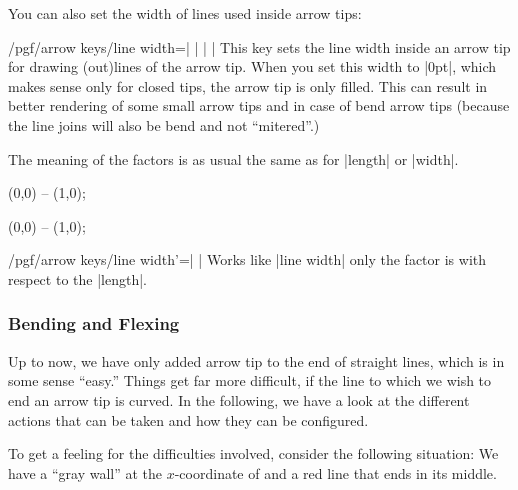 You can also set the width of lines used inside arrow tips:

\begin{key}{/pgf/arrow keys/line width=| |%
    | |}
  This key sets the line width inside an arrow tip for drawing
  (out)lines of the arrow tip. When you set this width to |0pt|, which
  makes sense only for closed tips, the arrow tip is only filled. This
  can result in better rendering of some small arrow tips and in case
  of bend arrow tips (because the line joins will also be bend and not
  ``mitered''.)

  The meaning of the factors is as usual the same as for |length| or |width|.
  
\begin{codeexample}[width=2cm]
\tikz \draw [arrows = {-Latex[line width=0.1pt, fill=white, length=10pt]}] (0,0) -- (1,0);
\end{codeexample}
\begin{codeexample}[width=2cm]
\tikz \draw [arrows = {-Latex[line width=1pt, fill=white, length=10pt]}] (0,0) -- (1,0);
\end{codeexample}
\end{key}


\begin{key}{/pgf/arrow keys/line width'=| |}
  Works like |line width| only the factor is with respect to the |length|.  
\end{key}

\subsubsection{Bending and Flexing}

\label{section-arrow-flex}

Up to now, we have only added arrow tip to the end of straight lines,
which is in some sense ``easy.'' Things get far more difficult, if the
line to which we wish to end an arrow tip is curved. In the following,
we have a look at the different actions that can be taken and how they
can be configured.

To get a feeling for the difficulties involved, consider the following
situation: We have a ``gray wall'' at the $x$-coordinate of and a
red line that ends in its middle.

\begin{codeexample}[]
\def\wall{ \fill     [fill=black!50]  (1,-.5) rectangle (2,.5);
           \pattern  [pattern=bricks] (1,-.5) rectangle (2,.5);
           \draw     [line width=1pt]  (1cm+.5pt,-.5) -- ++(0,1); }
\end{codeexample}

